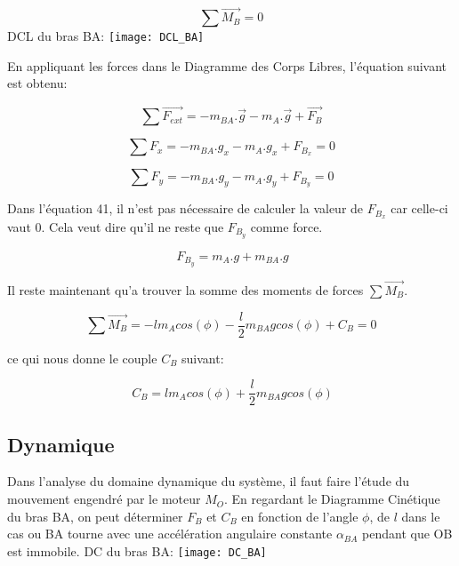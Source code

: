 \documentclass{article}
\begin{document}
\begin{equation}
\sum \overrightarrow{M_B} = 0
\end{equation}
\newline
\newline
DCL du bras BA:
\newline
\noindent \texttt{[image: DCL\_BA]}

\noindent En appliquant les forces dans le Diagramme des Corps Libres, l'équation suivant est obtenu:

\begin{equation}
\sum \overrightarrow{F_{ext}} = -m_{BA}.\overrightarrow{g} -m_A.\overrightarrow{g} + \overrightarrow{F_B}
\end{equation}

\begin{equation}
\sum F_x = -m_{BA}.g_x -m_A.g_x + F_{B_x} = 0
\end{equation}

\begin{equation}
\sum F_y = -m_{BA}.g_y -m_A.g_y + F_{B_y} = 0
\end{equation}

\noindent Dans l'équation 41, il n'est pas nécessaire de calculer la valeur de $F_{B_x}$ car celle-ci vaut 0. Cela veut dire qu'il ne reste que $F_{B_y}$ comme force.

\begin{equation}
\ F_{B_y} = m_A.g + m_{BA}.g
\end{equation}

\noindent Il reste maintenant qu'a trouver la somme des moments de forces $\sum \overrightarrow{M_B}$.

\begin{equation}
\sum \overrightarrow{M_B} = -lm_Acos(\phi) - \frac{l}{2}m_{BA}gcos(\phi) + C_B = 0
\end{equation}

\noindent ce qui nous donne le couple $C_B$ suivant: 

\begin{equation}
\ C_B = lm_Acos(\phi)+ \frac{l}{2}m_{BA}gcos(\phi)
\end{equation}

\subsection{Dynamique}
Dans l'analyse du domaine dynamique du système, il faut faire l'étude du mouvement engendré par le moteur $M_O$. En regardant le Diagramme Cinétique du bras BA, on peut déterminer $F_B$ et $C_B$ en fonction de l'angle $\phi$, de $l$ dans le cas ou BA tourne avec une accélération angulaire constante $\alpha_{BA}$ pendant que OB est immobile.
\newline
\newline
\noindent DC du bras BA:
\newline
\noindent \texttt{[image: DC\_BA]}
\end{document}
